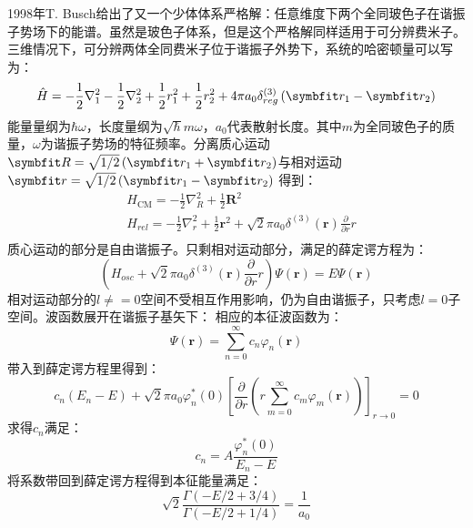 1998年T. Busch给出了又一个少体体系严格解：任意维度下两个全同玻色子在谐振子势场下的能谱。虽然是玻色子体系，但是这个严格解同样适用于可分辨费米子。三维情况下，可分辨两体全同费米子位于谐振子外势下，系统的哈密顿量可以写为：
\begin{equation}
\hat{H}=-\frac{1}{2} \nabla_{1}^{2}-\frac{1}{2} \nabla_{2}^{2}+\frac{1}{2} r_{1}^{2}+\frac{1}{2} r_{2}^{2}+4 \pi a_{0} \delta_{r e g}^{(3)}\left(\Vector{r}_{1}-\Vector{r}_{2}\right)
\end{equation}
能量量纲为$\hbar\omega$，长度量纲为$\sqrt{\hbar}{m\omega}$，$a_0$代表散射长度。其中$m$为全同玻色子的质量，$\omega$为谐振子势场的特征频率。分离质心运动$\Vector{R}=\sqrt{1 / 2}\left(\Vector{r}_{1}+\Vector{r}_{2}\right)$与相对运动$\Vector{r}=\sqrt{1 / 2}\left(\Vector{r}_{1}-\Vector{r}_{2}\right)$
得到：
\begin{equation}
\begin{aligned}
&H_{\mathrm{CM}}=-\frac{1}{2} \nabla_{R}^{2}+\frac{1}{2} \mathbf{R}^{2}\\
&H_{r e l}=-\frac{1}{2} \nabla_{r}^{2}+\frac{1}{2} \mathbf{r}^{2}+\sqrt{2} \pi a_{0} \delta^{(3)}(\mathbf{r}) \frac{\partial}{\partial r} r\\
\end{aligned}
\end{equation}
质心运动的部分是自由谐振子。只剩相对运动部分，满足的薛定谔方程为：
\begin{equation}
\left(H_{o s c}+\sqrt{2} \pi a_{0} \delta^{(3)}(\mathbf{r}) \frac{\partial}{\partial r} r\right) \Psi(\mathbf{r})=E \Psi(\mathbf{r})
\end{equation}
相对运动部分的$l\neq=0$空间不受相互作用影响，仍为自由谐振子，只考虑$l=0$子空间。波函数展开在谐振子基矢下：
相应的本征波函数为：
\begin{equation}
\Psi(\mathbf{r})=\sum_{n=0}^{\infty} c_{n} \varphi_{n}(\mathbf{r})
\end{equation}
带入到薛定谔方程里得到：
\begin{equation}
c_{n}\left(E_{n}-E\right)+\sqrt{2} \pi a_{0} \varphi_{n}^{*}(0)\left[\frac{\partial}{\partial r}\left(r \sum_{m=0}^{\infty} c_{m} \varphi_{m}(\mathbf{r})\right)\right]_{r \rightarrow 0}=0
\end{equation}
求得$c_n$满足：
\begin{equation}
c_{n}=A \frac{\varphi_{n}^{*}(0)}{E_{n}-E}
\end{equation}
将系数带回到薛定谔方程得到本征能量满足：
\begin{equation}
\sqrt{2} \frac{\Gamma(-E / 2+3 / 4)}{\Gamma(-E / 2+1 / 4)}=\frac{1}{a_{0}}
\end{equation}
